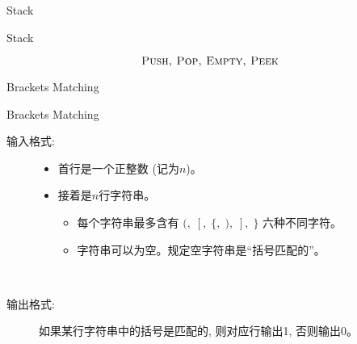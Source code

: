 \begin{frame}{}
  \centerline{\Large Stack}
\end{frame}

\begin{frame}{Stack}

  \[
    \textsc{Push, Pop, Empty, Peek}
  \]
\end{frame}

\begin{frame}{Brackets Matching}
  \begin{exampleblock}{Brackets Matching}
    \centerline{}

    \vspace{0.60cm}
    \begin{description}
      \item[输入格式:]
	\begin{itemize}
	  \item 首行是一个正整数 (记为$n$)。
	  \item 接着是$n$行字符串。
	    \begin{itemize}
	      \item 每个字符串最多含有 $(,\; [,\; \{,\; ),\; ],\; \}$ 六种不同字符。
	      \item 字符串可以为空。规定空字符串是``括号匹配的''。
	    \end{itemize}
	\end{itemize}
  　  \item[输出格式:] 如果某行字符串中的括号是匹配的, 则对应行输出1, 否则输出0。
    \end{description}
  \end{exampleblock}
\end{frame}
